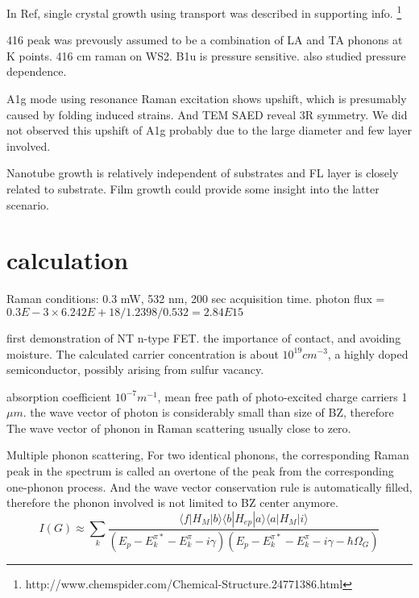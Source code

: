In Ref\cite{Zeng2013}, single crystal  growth using  transport was described in supporting info.
\footnote{http://www.chemspider.com/Chemical-Structure.24771386.html}

416 peak was prevously assumed to be a combination of LA and TA phonons at K points.
416 cm raman on WS2. B1u is pressure sensitive. \cite{Staiger2012} also studied pressure dependence.

A1g mode using resonance Raman excitation shows upshift, which is presumably caused by folding induced strains. And TEM SAED reveal 3R symmetry. We did not observed this upshift of A1g probably due to the large diameter and few layer involved.

Nanotube growth is relatively independent of substrates and FL layer is closely related to substrate. Film growth could provide some insight into the latter scenario.

\section{calculation}

Raman conditions: 0.3 mW, 532 nm, 200 sec acquisition time. photon flux = $0.3E-3\times6.242E+18/1.2398/0.532=2.84E15$

first demonstration of  NT n-type FET. \cite{Levi2013}
the importance of contact, and avoiding moisture. The calculated carrier concentration is about $10^{19}cm^{-3}$, a highly doped semiconductor, possibly arising from sulfur vacancy. 

 absorption coefficient $10^{-7}m^{-1}$, mean free path of photo-excited charge carriers 1 $\mu m$. the wave vector of photon is considerably small than size of BZ, therefore The wave vector of phonon in Raman scattering usually close to zero.

Multiple phonon scattering, For two identical phonons, the corresponding Raman peak in the spectrum is called an overtone of the peak from the corresponding one-phonon process. And the wave vector conservation rule is automatically filled, therefore the phonon involved is not limited to BZ center anymore.
\[
I(G) \approx \sum_k \frac{\langle f|H_M|b\rangle \langle b|H_{ep}|a\rangle \langle a|H_M|i\rangle}{(E_p - E_k^{\pi *}- E_k^{\pi}-i\gamma)(E_p - E_k^{\pi *}- E_k^{\pi}-i\gamma- \hbar\Omega_{G})}
\]


